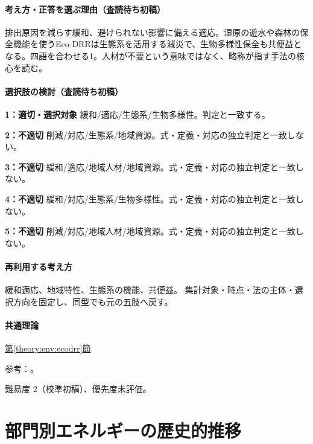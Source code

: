 \paragraph{考え方・正答を選ぶ理由（査読待ち初稿）} 排出原因を減らす緩和、避けられない影響に備える適応。湿原の遊水や森林の保全機能を使うEco-DRRは生態系を活用する減災で、生物多様性保全も共便益となる。四語を合わせる1。人材が不要という意味ではなく、略称が指す手法の核心を読む。

\paragraph{選択肢の検討（査読待ち初稿）}\mbox{}\par

\noindent\textbf{1：適切・選択対象} 緩和/適応/生態系/生物多様性。判定と一致する。\par

\noindent\textbf{2：不適切} 削減/対応/生態系/地域資源。式・定義・対応の独立判定と一致しない。\par

\noindent\textbf{3：不適切} 緩和/適応/地域人材/地域資源。式・定義・対応の独立判定と一致しない。\par

\noindent\textbf{4：不適切} 緩和/対応/生態系/生物多様性。式・定義・対応の独立判定と一致しない。\par

\noindent\textbf{5：不適切} 削減/対応/地域人材/地域資源。式・定義・対応の独立判定と一致しない。\par

\paragraph{再利用する考え方} 緩和適応、地域特性、生態系の機能、共便益。 集計対象・時点・法の主体・選択方向を固定し、同型でも元の五肢へ戻す。

\paragraph{共通理論} \hyperref[theory:env:ecodrr]{第\ref*{theory:env:ecodrr}節}

\par 参考：\cite{env59_ecodrr}。

\par 難易度 2（校準初稿）、優先度未評価。

\section{部門別エネルギーの歴史的推移}

